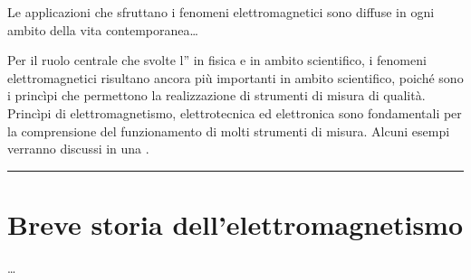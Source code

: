 \documentclass[letterpaper,10pt,italian]{jupyterBook}
\begin{document}
\sphinxAtStartPar
Le applicazioni che sfruttano i fenomeni elettromagnetici sono diffuse in ogni ambito della vita contemporanea…

\sphinxAtStartPar
Per il ruolo centrale che svolte l”{\hyperref[\detokenize{ch/intro/measurements:physics-hs-intro-measurements}]{}} in fisica e in ambito scientifico, i fenomeni elettromagnetici risultano ancora più importanti in ambito scientifico, poiché sono i princìpi che permettono la realizzazione di strumenti di misura di qualità. Princìpi di elettromagnetismo, elettrotecnica ed elettronica sono fondamentali per la comprensione del funzionamento di molti strumenti di misura. Alcuni esempi verranno discussi in una {\hyperref[\detokenize{ch/electromagnetism/electrical-engineering-instruments:physics-hs-electromagnetism-instruments}]{}}.


\bigskip\hrule\bigskip


\sphinxstepscope


\section{Breve storia dell’elettromagnetismo}
\label{\detokenize{ch/electromagnetism/intro-history:breve-storia-dell-elettromagnetismo}}\label{\detokenize{ch/electromagnetism/intro-history:physics-hs-electromagnetism-intro-history}}\label{\detokenize{ch/electromagnetism/intro-history::doc}}
\sphinxAtStartPar
{}
…
\end{document}

